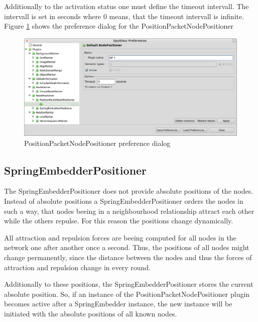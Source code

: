 Additionally to the activation status one must define the timeout intervall. The intervall is set in seconds where 0 means,
that the timeout intervall is infinite. Figure \ref{pic:ppnp_preferences} shows the preference dialog 
for the PositionPacketNodePositioner

\begin{figure}[htb]
  \begin{center}
    \includegraphics[width=13.2cm]{./pics/positionpacketnodepositioner_prefpage}
    \caption{PositionPacketNodePositioner preference dialog}
    \label{pic:ppnp_preferences}
  \end{center}
\end{figure}

\subsection{SpringEmbedderPositioner}
\label{subsection:sep}

The SpringEmbedderPositioner does not provide absolute positions of the nodes. Instead of absolute positions 
a SpringEmbedderPositioner orders the nodes in such a way, that
nodes beeing in a neighbourhood relationship attract each other while the others repulse. For this reason
the positions change dynamically.

All attraction and repulsion forces are beeing computed for all nodes in the network one after another
once a second. Thus, the positions of all nodes might change permanently, since the distance between the nodes
and thus the forces of attraction and repulsion change in every round.

Additionally to these positions, the SpringEmbedderPositioner stores the current absolute position. So, if an instance of the
PositionPacketNodePositioner plugin becomes active after a SpringEmbedder instance, the new instance will be
initiated with the absolute positions of all known nodes.

